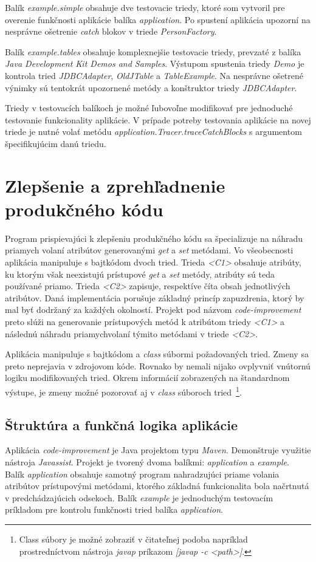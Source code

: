 \documentclass[11pt,final,oneside]{fithesis}
\begin{document}
Balík \textit{example.simple} obsahuje dve testovacie triedy, ktoré som 
vytvoril pre overenie funkčnosti aplikácie balíka \textit{application}. Po 
spustení aplikácia upozorní na nesprávne ošetrenie \textit{catch} blokov v 
triede \textit{PersonFactory}.

Balík \textit{example.tables} obsahuje komplexnejšie testovacie triedy, 
prevzaté z balíka \textit{Java Development Kit Demos and Samples}. Výstupom 
spustenia triedy \textit{Demo} je kontrola tried \textit{JDBCAdapter}, \textit{
OldJTable} a \textit{TableExample}. Na nesprávne ošetrené výnimky sú tentokrát 
upozornené metódy a konštruktor triedy \textit{JDBCAdapter}.

Triedy v testovacích balíkoch je možné ľubovoľne modifikovať pre jednoduché 
testovanie funkcionality aplikácie. V prípade potreby testovania aplikácie na 
novej triede je nutné volať metódu \textit{application.Tracer.traceCatchBlocks}
s argumentom špecifikujúcim danú triedu.

\section{Zlepšenie a zprehľadnenie produkčného kódu}
Program prispievajúci k zlepšeniu produkčného kódu sa špecializuje na náhradu 
priamych volaní atribútov generovanými \textit{get} a \textit{set} metódami. Vo
všeobecnosti aplikácia manipuluje s bajtkódom dvoch tried. Trieda \textit{<C1>}
obsahuje atribúty, ku ktorým však neexistujú prístupové \textit{get} a 
\textit{set} metódy, atribúty sú teda používané priamo. Trieda \textit{<C2>} 
zapisuje, respektíve číta obsah jednotlivých atribútov. Daná implementácia 
porušuje základný princíp zapuzdrenia, ktorý by mal byť dodržaný za každých 
okolností. Projekt pod názvom \textit{code-improvement} preto slúži na 
generovanie prístupových metód k atribútom triedy \textit{<C1>} a následnú 
náhradu priamychvolaní týmito metódami v triede \textit{<C2>}.

Aplikácia manipuluje s bajtkódom a \textit{class} súbormi požadovaných tried. 
Zmeny sa preto neprejavia v zdrojovom kóde. Rovnako by nemali nijako ovplyvniť 
vnútornú logiku modifikovaných tried. Okrem informácií zobrazených na 
štandardnom výstupe, je zmeny možné pozorovať aj v \textit{class} súboroch 
tried~\footnote{Class súbory je možné zobraziť v čitateľnej podoba napríklad 
prostredníctvom nástroja \textit{javap} príkazom \textit{[javap -c <path>]}.}.

\subsection{Štruktúra a funkčná logika aplikácie}
Aplikácia \textit{code-improvement} je Java projektom typu \textit{Maven}. 
Demonštruje využitie nástroja \textit{Javassist}. Projekt je tvorený dvoma 
balíkmi: \textit{application} a \textit{example}. Balík \textit{application} 
obsahuje samotný program nahradzujúci priame volania atribútov prístupovými 
metódami, ktorého základná funkcionalita bola načrtnutá v predchádzajúcich 
odsekoch. Balík \textit{example} je jednoduchým testovacím príkladom pre 
kontrolu funkčnosti tried balíka \textit{application}.
\end{document}

